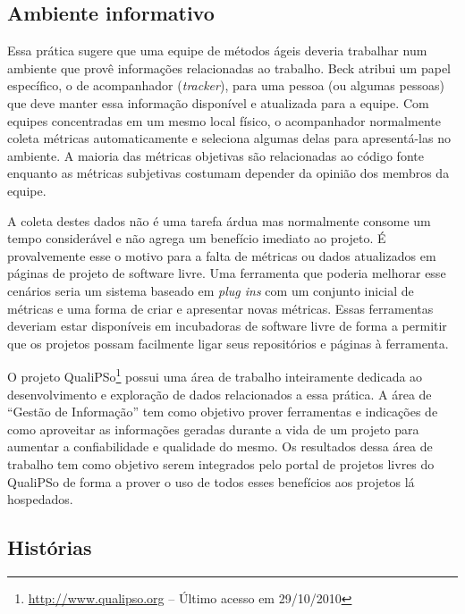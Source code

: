 \subsection{Ambiente informativo}
\label{subsec:inform-worksp}

Essa prática sugere que uma equipe de métodos ágeis deveria trabalhar
num ambiente que provê informações relacionadas ao trabalho. Beck
\cite{XP01} atribui um papel específico, o de acompanhador
(\emph{tracker}), para uma pessoa (ou algumas pessoas) que deve manter
essa informação disponível e atualizada para a equipe. Com equipes
concentradas em um mesmo local físico, o acompanhador normalmente
coleta métricas \cite{Sato2007} automaticamente e seleciona algumas
delas para apresentá-las no ambiente. A maioria das métricas objetivas
são relacionadas ao código fonte enquanto as métricas subjetivas
costumam depender da opinião dos membros da equipe.

A coleta destes dados não é uma tarefa árdua mas normalmente consome
um tempo considerável e não agrega um benefício imediato ao projeto. É
provalvemente esse o motivo para a falta de métricas ou dados
atualizados em páginas de projeto de software livre. Uma ferramenta
que poderia melhorar esse cenários seria um sistema baseado em
\emph{plug ins} com um conjunto inicial de métricas e uma forma de
criar e apresentar novas métricas. Essas ferramentas deveriam estar
disponíveis em incubadoras de software livre de forma a permitir que
os projetos possam facilmente ligar seus repositórios e páginas à
ferramenta.

O projeto QualiPSo\footnote{\url{http://www.qualipso.org} -- Último
  acesso em 29/10/2010} possui uma área de trabalho inteiramente
dedicada ao desenvolvimento e exploração de dados relacionados a essa
prática. A área de ``Gestão de Informação'' tem como objetivo prover
ferramentas e indicações de como aproveitar as informações geradas
durante a vida de um projeto para aumentar a confiabilidade e
qualidade do mesmo. Os resultados dessa área de trabalho tem como
objetivo serem integrados pelo portal de projetos livres do QualiPSo
de forma a prover o uso de todos esses benefícios aos projetos lá
hospedados.

\subsection{Histórias}
\label{subsec:stories}

